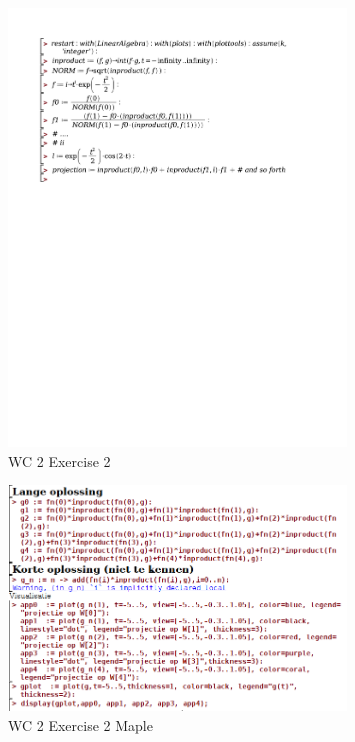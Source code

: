 \documentclass[a4paper]{report}
\begin{document}
\begin{figure}[H]
	\centering
	\includegraphics[width=0.8\textwidth]{exercises/wc_2_ex_2.pdf}
	\caption{WC 2 Exercise 2}
	\label{fig:wc_2_ex_2}
\end{figure}


\begin{figure}[H]
	\centering
	\includegraphics[width=0.8\textwidth]{assets/wc_2_ex_2_maple.png}
	\caption{WC 2 Exercise 2 Maple}
	\label{fig:wc_2_ex_2_maple}
\end{figure}
\end{document}
